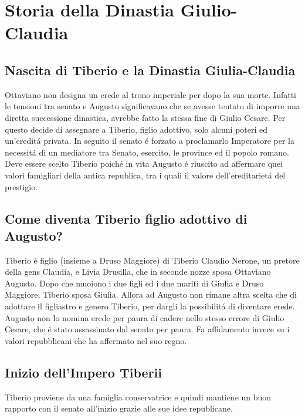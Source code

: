 \documentclass{article}
\title{\jobname}
\author{Eugenio Animali}
\begin{document}
\maketitle

\section{Storia della Dinastia Giulio-Claudia}

\subsection{Nascita di Tiberio e la Dinastia Giulia-Claudia}
Ottaviano non designa un erede al trono imperiale per dopo la sua morte. Infatti le tensioni tra senato e Augusto significavano che se avesse tentato di imporre una diretta successione dinastica, avrebbe fatto la stessa fine di Giulio Cesare. Per questo decide di assegnare a Tiberio, figlio adottivo, solo alcuni poteri ed un'ereditá privata. In seguito il senato é forzato a proclamarlo Imperatore per la necessitá di un mediatore tra Senato, esercito, le province ed il popolo romano. Deve essere scelto Tiberio poiché in vita Augusto é riuscito ad affermare quei valori famigliari della antica republica, tra i quali il valore dell'ereditarietá del prestigio.

\subsection{Come diventa Tiberio figlio adottivo di Augusto?}
Tiberio é figlio (insieme a Druso Maggiore) di Tiberio Claudio Nerone, un pretore della gens Claudia, e Livia Drusilla, che in seconde nozze sposa Ottaviano Augusto. Dopo che muoiono i due figli ed i due mariti di Giulia e Druso Maggiore, Tiberio sposa Giulia. Allora ad Augusto non rimane altra scelta che di adottare il figliastro e genero Tiberio, per dargli la possibilitá di diventare erede. Augusto non lo nomina erede per paura di cadere nello stesso errore di Giulio Cesare, che é stato assassinato dal senato per paura. Fa affidamento invece su i valori repubblicani che ha affermato nel suo regno.

\subsection{Inizio dell'Impero Tiberii}
Tiberio proviene da una famiglia conservatrice e quindi mantiene un buon rapporto con il senato all'inizio grazie alle sue idee republicane.
\end{document}
